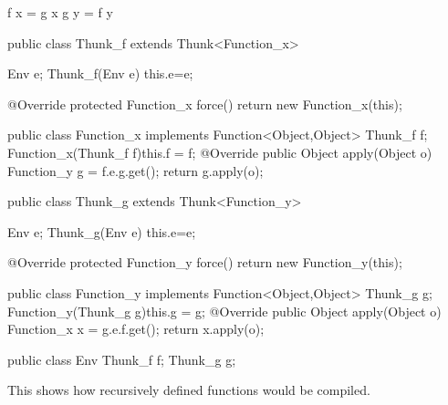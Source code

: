 \documentclass[12pt,a4paper,twoside]{article}
\begin{document}
\begin{JavaLst}
f x = g x
g y = f y

public class Thunk_f extends Thunk<Function_x> {
    Env e;
    Thunk_f(Env e) {this.e=e;}

    @Override
    protected Function_x force() {
        return new Function_x(this);
    }
}

public class Function_x implements Function<Object,Object> {
    Thunk_f f;
    Function_x(Thunk_f f){this.f = f;}
    @Override
    public Object apply(Object o) {
        Function_y g = f.e.g.get();
        return g.apply(o);
    }
}

public class Thunk_g extends Thunk<Function_y> {
    Env e;
    Thunk_g(Env e) {this.e=e;}

    @Override
    protected Function_y force() {
        return new Function_y(this);
    }
}

public class Function_y implements Function<Object,Object> {
    Thunk_g g;
    Function_y(Thunk_g g){this.g = g;}
    @Override
    public Object apply(Object o) {
        Function_x x = g.e.f.get();
        return x.apply(o);
    }
}

public class Env {
    Thunk_f f;
    Thunk_g g;
}
\end{JavaLst}

This shows how recursively defined functions would be compiled.
\end{document}
